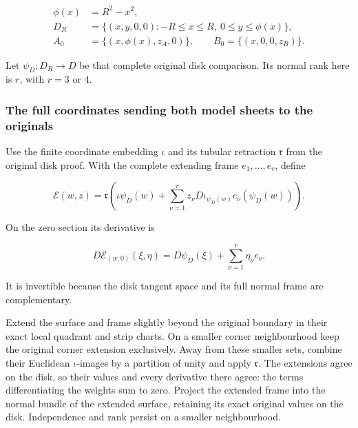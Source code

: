 \begin{equation}
\begin{aligned}
 \phi(x)&=R^2-x^2,\\
 D_R&=\{(x,y,0,0):-R\leq x\leq R,\ 0\leq y\leq\phi(x)\},\\
 A_0&=\{(x,\phi(x),z_A,0)\},\qquad
 B_0=\{(x,0,0,z_B)\}.
 \end{aligned}
 \label{courseIII:whitney-moves-in-the-receiving-dimensions:eq:4.2}
\end{equation}

Let \(\psi_D:D_R\to D\) be that complete original disk comparison. Its normal rank here is \(r\), with \(r=3\) or \(4\).

\subsubsection{The full coordinates sending both model sheets to the originals}
\label{courseIII:whitney-moves-in-the-receiving-dimensions:section-4.1}

Use the finite coordinate embedding \(\iota\) and its tubular retraction \(\mathfrak r\) from the original disk proof. With the complete extending frame \(e_1,\ldots,e_r\), define

\begin{equation}
\mathcal E(w,z)=\mathfrak r\left(
   \iota\psi_D(w)+
   \sum_{\nu=1}^r z_\nu D\iota_{\psi_D(w)}e_\nu(\psi_D(w))
 \right).
 \label{courseIII:whitney-moves-in-the-receiving-dimensions:eq:4.3}
\end{equation}

On the zero section its derivative is

\begin{equation}
D\mathcal E_{(w,0)}(\xi,\eta)
    =D\psi_D(\xi)+\sum_{\nu=1}^r\eta_\nu e_\nu .
 \label{courseIII:whitney-moves-in-the-receiving-dimensions:eq:4.4}
\end{equation}

It is invertible because the disk tangent space and its full normal frame are complementary.

Extend the surface and frame slightly beyond the original boundary in their exact local quadrant and strip charts. On a smaller corner neighbourhood keep the original corner extension exclusively. Away from these smaller sets, combine their Euclidean \(\iota\)-images by a partition of unity and apply \(\mathfrak r\). The extensions agree on the disk, so their values and every derivative there agree: the terms differentiating the weights sum to zero. Project the extended frame into the normal bundle of the extended surface, retaining its exact original values on the disk. Independence and rank persist on a smaller neighbourhood.

